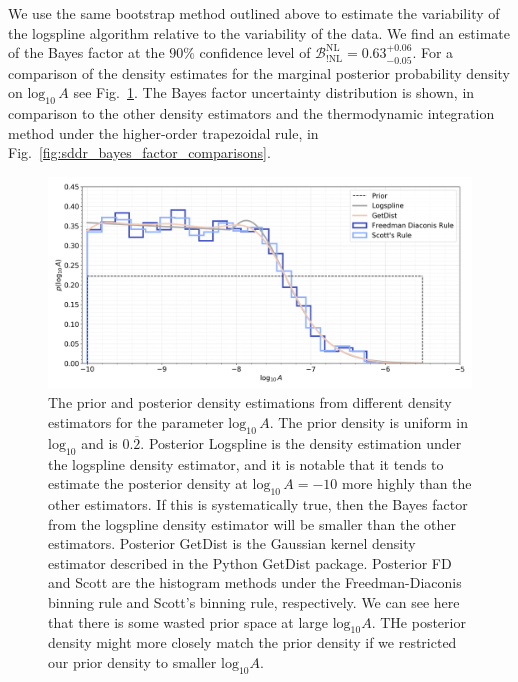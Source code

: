 We use the same bootstrap method outlined above to estimate the variability of the logspline algorithm relative to the variability of the data. We find an estimate of the Bayes factor at the $90\%$ confidence level of $\mathcal{B}^{\mathrm{NL}}_{!\mathrm{NL}} = 0.63^{+0.06}_{-0.05}$. For a comparison of the density estimates for the marginal posterior probability density on $\mathrm{log}_{10} \, A$ see Fig.~\ref{fig:density_estimators}. The Bayes factor uncertainty distribution is shown, in comparison to the other density estimators and the thermodynamic integration method under the higher-order trapezoidal rule, in Fig.~\ref{fig:sddr_bayes_factor_comparisons}.

\begin{figure}[th]
\centering
\includegraphics[width=1.0\textwidth]{figs/chapter6/prior_posterior_sddr.png}
\caption{The prior and posterior density estimations from different density estimators for the parameter $\mathrm{log}_{10} \, A$. The prior density is uniform in $\mathrm{log}_{10}$ and is $0.\overbar{2}$. Posterior Logspline is the density estimation under the logspline density estimator, and it is notable that it tends to estimate the posterior density at $\mathrm{log}_{10} \, A = -10$ more highly than the other estimators. If this is systematically true, then the Bayes factor from the logspline density estimator will be smaller than the other estimators. Posterior GetDist is the Gaussian kernel density estimator described in the Python GetDist package. Posterior FD and Scott are the histogram methods under the Freedman-Diaconis binning rule and Scott's binning rule, respectively. We can see here that there is some wasted prior space at large $\mathrm{log}_{10} A$. THe posterior density might more closely match the prior density if we restricted our prior density to smaller $\mathrm{log}_{10} A$.}
\label{fig:density_estimators}
\end{figure}

